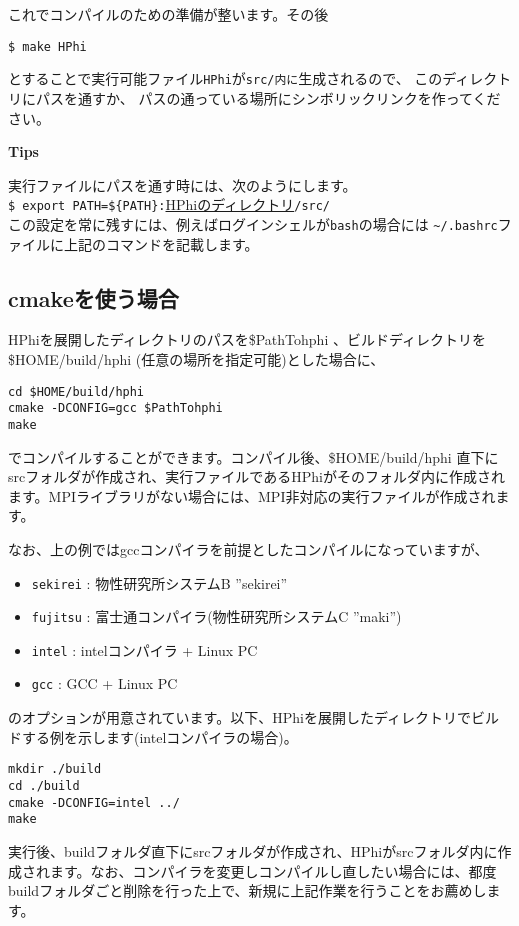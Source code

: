 これでコンパイルのための準備が整います。その後
\begin{verbatim}
$ make HPhi
\end{verbatim}
とすることで実行可能ファイル\verb|HPhi|が\verb|src/内に|生成されるので、
このディレクトリにパスを通すか、
パスの通っている場所にシンボリックリンクを作ってください。

\begin{screen}
\Large 
{\bf Tips}
\normalsize

実行ファイルにパスを通す時には、次のようにします。
\\
\verb|$ export PATH=${PATH}:|\underline{HPhiのディレクトリ}\verb|/src/|
\\
この設定を常に残すには、例えばログインシェルが\verb|bash|の場合には
\verb|~/.bashrc|ファイルに上記のコマンドを記載します。
\end{screen}

\subsection{cmakeを使う場合}
HPhiを展開したディレクトリのパスを\$PathTohphi 、ビルドディレクトリを\$HOME/build/hphi (任意の場所を指定可能)とした場合に、
\begin{verbatim}
cd $HOME/build/hphi
cmake -DCONFIG=gcc $PathTohphi
make
\end{verbatim}
でコンパイルすることができます。コンパイル後、\$HOME/build/hphi 直下にsrcフォルダが作成され、実行ファイルであるHPhiがそのフォルダ内に作成されます。MPIライブラリがない場合には、MPI非対応の実行ファイルが作成されます。

なお、上の例ではgccコンパイラを前提としたコンパイルになっていますが、
\begin{itemize}
\item \verb|sekirei| : 物性研究所システムB ''sekirei''
\item \verb|fujitsu| : 富士通コンパイラ(物性研究所システムC ''maki'')
\item \verb|intel| : intelコンパイラ + Linux PC
\item \verb|gcc| : GCC + Linux PC
\end{itemize}
のオプションが用意されています。以下、HPhiを展開したディレクトリでビルドする例を示します(intelコンパイラの場合)。
\begin{verbatim}
mkdir ./build
cd ./build
cmake -DCONFIG=intel ../
make
\end{verbatim}
実行後、buildフォルダ直下にsrcフォルダが作成され、HPhiがsrcフォルダ内に作成されます。なお、コンパイラを変更しコンパイルし直したい場合には、都度buildフォルダごと削除を行った上で、新規に上記作業を行うことをお薦めします。


